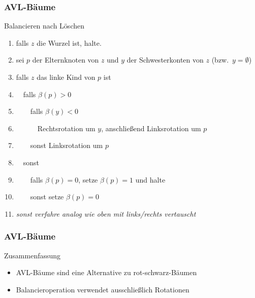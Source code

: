 \documentclass[aspectratio=1610, 11pt]{beamer}
\newcommand{\mytitle}{AVL-B\"aume}
\begin{document}
\begin{frame}\frametitle{\mytitle}
	\begin{exampleblock}{Balancieren nach L\"oschen}
		\begin{enumerate}
			\item falls $z$ die Wurzel ist, halte.
			\item sei $p$ der Elternknoten von $z$ und $y$ der Schwesterkonten von $z$ (bzw.\ $y=\emptyset$)
			\item falls $z$ das linke Kind von $p$ ist
			\item $\quad$falls $\beta(p)>0$
			\item $\qquad$falls $\beta(y)<0$
			\item $\quad\qquad$Rechtsrotation um $y$, anschlie\ss end Linksrotation um $p$
			\item $\qquad$sonst Linksrotation um $p$
			\item $\quad$sonst
			\item $\qquad$falls $\beta(p)=0$, setze $\beta(p)=1$ und halte
			\item $\qquad$sonst setze $\beta(p)=0$ %
			\item \itshape sonst verfahre analog wie oben mit links/rechts vertauscht
		\end{enumerate}	
	\end{exampleblock}
\end{frame}

\begin{frame}\frametitle{\mytitle}
	\begin{exampleblock}{Zusammenfassung}
		\begin{itemize}
			\item AVL-B\"aume sind eine Alternative zu rot-schwarz-B\"aumen
			\item Balancieroperation verwendet ausschlie\ss lich Rotationen
		\end{itemize}	
	\end{exampleblock}
\end{frame}
\end{document}
